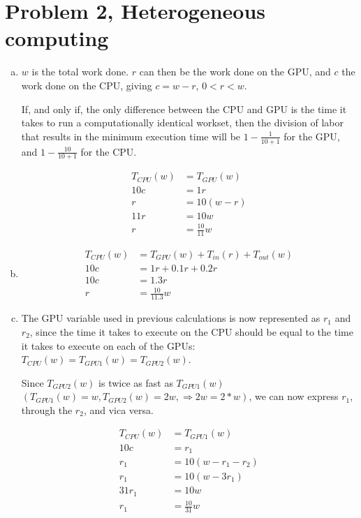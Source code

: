 \documentclass[fontsize=11pt, paper=a4, titlepage]{article}
\begin{document}
\section*{Problem 2, Heterogeneous computing}
    \begin{enumerate}[a)]

        \item $w$ is the total work done. $r$ can then be the work done on the
GPU, and $c$ the work done on the CPU, giving $c = w - r$, $0 < r < w$.

If, and only if, the only difference between the CPU and GPU is the time it
takes to run a computationally identical workset, then the division of labor
that results in the minimum execution time will be $1-\frac{1}{10+1}$ for the
GPU, and $1-\frac{10}{10+1}$ for the CPU.

        \begin{align*}
            T_{CPU}(w) &= T_{GPU}(w) \\
            10c &= 1r \\
            r &= 10(w-r) \\
            11r &= 10w \\
            r &= \frac{10}{11}w
        \end{align*}

        \item
        \begin{align*}
            T_{CPU}(w) &= T_{GPU}(w) + T_{in}(r) + T_{out}(w) \\
            10c &= 1r + 0.1r + 0.2r \\
            10c &= 1.3r \\
            r &= \frac{10}{11.3}w
        \end{align*}

        \item The GPU variable used in previous calculations is now represented
as $r_1$ and $r_2$, since the time it takes to execute on the CPU should be
equal to the time it takes to execute on each of the GPUs: $T_{CPU}(w) =
T_{GPU1}(w) = T_{GPU2}(w)$.

Since $T_{GPU2}(w)$ is twice as fast as $T_{GPU1}(w)$ $(T_{GPU1}(w) = w,
T_{GPU2}(w) = 2w, \Rightarrow 2w = 2*w)$, we can now express $r_1$, through the
$r_2$, and vica versa.

        \begin{align*}
            T_{CPU}(w) &= T_{GPU1}(w) \\
            10c &= r_1 \\
            r_1 &= 10(w - r_1 - r_2) \\
            r_1 &= 10(w - 3r_1) \\
            31r_1 &= 10w \\
            r_1 &= \frac{10}{31}w
        \end{align*}


\end{enumerate}
\end{document}
